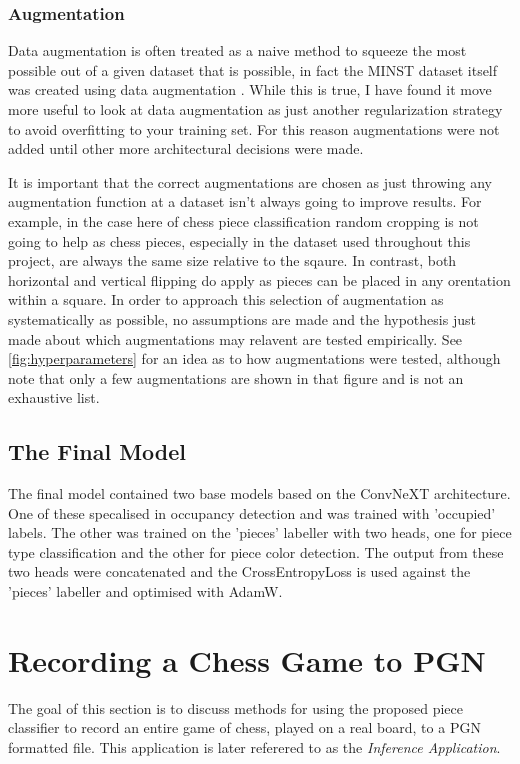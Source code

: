 \subsubsection{Augmentation}
Data augmentation is often treated as a naive method to squeeze the most possible out of a given dataset that is possible, in fact the MINST dataset itself was 
created using data augmentation \cite{cohen2017emnist}.  While this is true, I have found 
it move more useful to look at data augmentation as just another regularization strategy to avoid overfitting to your training set.  For this reason 
augmentations were not added until other more architectural decisions were made.

It is important that the correct augmentations are chosen as just 
throwing any augmentation function at a dataset isn't always going to improve results.
For example, in the case here of chess piece classification random cropping is not going to help as chess pieces, especially in the dataset used throughout this 
project, are always the same size relative to the sqaure.  In contrast, both horizontal and vertical flipping do apply as pieces can be placed in any orentation 
within a square.
In order to approach this selection of augmentation as systematically as possible, no assumptions are made and the hypothesis just made about which augmentations 
may relavent are tested empirically.  See \autoref{fig:hyperparameters} for an idea as to how augmentations were tested, although note that only a few augmentations 
are shown in that figure and is not an exhaustive list.

\subsection{The Final Model}
\label{the model}
The final model contained two base models based on the ConvNeXT architecture.  One of these specalised in occupancy detection and was trained with 'occupied' labels.
The other was trained on the 'pieces' labeller with two heads, one for piece type classification and the other for piece color detection.  The output from these two 
heads were concatenated and the CrossEntropyLoss is used against the 'pieces' labeller and optimised with AdamW.



\section{Recording a Chess Game to PGN}
\label{inference}
The goal of this section is to discuss methods for using the proposed piece classifier to record an entire game of chess, played on a real board, 
to a PGN formatted file.  This application is later referered to as the \textit{Inference Application}.

